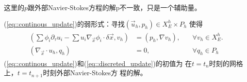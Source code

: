     \begin{remark}
       这里的$p$跟外部Navier-Stokes方程的解p不一致，只是一个辅助量。
    \end{remark}

    (\ref{eq::continous_update})的弱形式：寻找$\left(\vec{u}_h, p_h
    \right) \in X_E^h \times P_h$ 使得
    \begin{eqnarray}
      \begin{aligned}
        \left( \sum \phi_i \partial_{\tau}u_i - \sum u_i
          \nabla_{\vec{x}} \phi_i \cdot \delta \vec{x}, v_h \right)& =
        \left( p_h, \nabla v_h \right),& \quad \forall v_h \in X_E^h. \\
        \left( \nabla_{\vec{x}} \cdot u_h, q_h \right)& = 0, &\quad
        \forall q_h \in P_h
      \end{aligned}
      \label{eq::discreted_update}
    \end{eqnarray}
    (\ref{eq::continous_update})和(\ref{eq::discreted_update})的初值为
    在$t = t_n$时刻的网格上，$t = t_{n + 1}$时刻外部Navier-Stokes方
    程的解。

